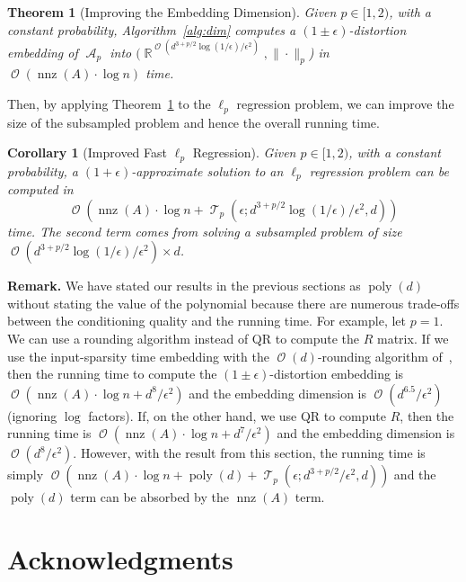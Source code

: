 \documentclass[11pt]{article}
\newtheorem{theorem}{Theorem}
\newtheorem{corollary}{Corollary}
\DeclareMathOperator{\poly}{poly}
\DeclareMathOperator{\bigO}{\mathcal{O}}
\DeclareMathOperator{\nnz}{nnz}
\DeclareMathOperator{\A}{\mathcal{A}}
\DeclareMathOperator{\R}{\mathbb{R}}
\DeclareMathOperator{\T}{\mathcal{T}}
\begin{document}
\begin{theorem}[Improving the Embedding Dimension]
  \label{thm:improved-dim}
  Given $p \in [1, 2)$, with a constant probability, Algorithm~\ref{alg:dim}
  computes a $(1\pm\epsilon)$-distortion embedding of $\A_p$ into
  $(\R^{\bigO(d^{3+p/2}\log(1/\epsilon)/\epsilon^2)}, \|\cdot\|_p$) in
  $\bigO(\nnz(A) \cdot \log n)$ time.
\end{theorem}

\noindent
Then, by applying Theorem~\ref{thm:improved-dim} to the $\ell_p$ regression
problem, we can improve the size of the subsampled problem and hence the overall
running time.

\begin{corollary}[Improved Fast $\ell_p$ Regression]
  Given $p \in [1, 2)$, with a constant probability, a
  $(1+\epsilon)$-approximate solution to an $\ell_p$ regression problem can be
  computed in
  \begin{equation*}
    \bigO(\nnz(A) \cdot \log n + \T_p(\epsilon; d^{3+p/2} \log(1/\epsilon) / \epsilon^2, d))
  \end{equation*}
  time.
  The second term comes from solving a subsampled problem of size
  $\bigO(d^{3+p/2} \log(1/\epsilon) / \epsilon^2) \times d$.
\end{corollary}

\noindent
\textbf{Remark.}
We have stated our results in the previous sections as $\poly(d)$ without
stating the value of the polynomial because there are numerous trade-offs
between the conditioning quality and the running time. 
For example, let $p = 1$.
We can use a rounding algorithm instead of QR to compute the $R$ matrix. 
If we use the input-sparsity time embedding with the $\bigO(d)$-rounding
algorithm of~\cite{CDMMMW13_SODA}, then the running time to compute the
$(1\pm\epsilon)$-distortion embedding is $\bigO(\nnz(A) \cdot \log n + d^8 /
\epsilon^2)$ and the embedding dimension is $\bigO(d^{6.5}/\epsilon^2)$
(ignoring $\log$ factors). 
If, on the other hand, we use QR to compute $R$, then the running time is
$\bigO(\nnz(A) \cdot \log n + d^7/\epsilon^2)$ and the embedding dimension is
$\bigO(d^8/\epsilon^2)$. 
However, with the result from this section, the running time is simply
$\bigO(\nnz(A) \cdot \log n + \poly(d) + \T_p(\epsilon; d^{3+p/2}/\epsilon^2,
d))$ and the $\poly(d)$ term can be absorbed by the $\nnz(A)$ term. 


\section{Acknowledgments}
\end{document}
